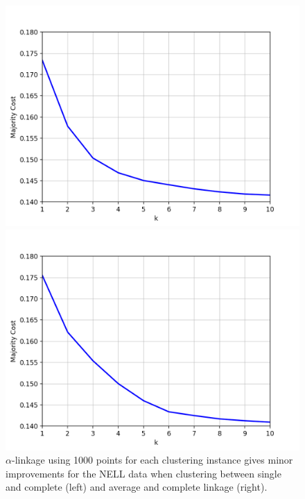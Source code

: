 \begin{figure}[H]
\centering
\begin{minipage}{.45\textwidth}
  \centering
  \includegraphics[width=\linewidth]{plots/nell_sc_1000_top10}
\end{minipage}
\begin{minipage}{.45\textwidth}
  \centering
  \includegraphics[width=\linewidth]{plots/nell_ac_1000_top10}
\end{minipage}
\caption{$\alpha$-linkage using 1000 points for each clustering instance gives minor improvements for the NELL data when clustering between single and complete (left) and average and complete linkage (right).}
\label{fig:nell1000top10}
\end{figure}

